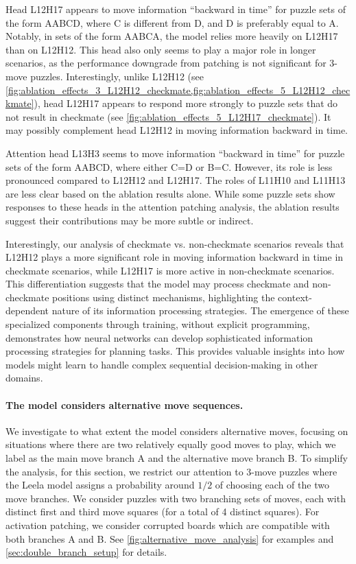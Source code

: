 \documentclass{article}
\begin{document}
Head L12H17 appears to move information ``backward in time'' for puzzle sets of the form AABCD, where C is different from D, and D is preferably equal to A. Notably, in sets of the form AABCA, the model relies more heavily on L12H17 than on L12H12. This head also only seems to play a major role in longer scenarios, as the performance downgrade from patching is not significant for 3-move puzzles. Interestingly, unlike L12H12 (see \cref{fig:ablation_effects_3_L12H12_checkmate,fig:ablation_effects_5_L12H12_checkmate}), head L12H17 appears to respond more strongly to puzzle sets that do not result in checkmate (see \cref{fig:ablation_effects_5_L12H17_checkmate}). It may possibly complement head L12H12 in moving information backward in time.

Attention head L13H3 seems to move information ``backward in time'' for puzzle sets of the form AABCD, where either C=D or B=C. However, its role is less pronounced compared to L12H12 and L12H17. The roles of L11H10 and L11H13 are less clear based on the ablation results alone. While some puzzle sets show responses to these heads in the attention patching analysis, the ablation results suggest their contributions may be more subtle or indirect.

Interestingly, our analysis of checkmate vs. non-checkmate scenarios reveals that L12H12 plays a more significant role in moving information backward in time in checkmate scenarios, while L12H17 is more active in non-checkmate scenarios. This differentiation suggests that the model may process checkmate and non-checkmate positions using distinct mechanisms, highlighting the context-dependent nature of its information processing strategies. The emergence of these specialized components through training, without explicit programming, demonstrates how neural networks can develop sophisticated information processing strategies for planning tasks. This provides valuable insights into how models might learn to handle complex sequential decision-making in other domains.

\paragraph{The model considers alternative move sequences.} We investigate to what extent the model considers alternative moves, focusing on situations where there are two relatively equally good moves to play, which we label as the main move branch A and the alternative move branch B. To simplify the analysis, for this section, we restrict our attention to 3-move puzzles where the Leela model assigns a probability around $1/2$ of choosing each of the two move branches. We consider puzzles with two branching sets of moves, each with distinct first and third move squares (for a total of 4 distinct squares). For activation patching, we consider corrupted boards which are compatible with both branches A and B. See \cref{fig:alternative_move_analysis} for examples and \cref{sec:double_branch_setup} for details.
\end{document}
